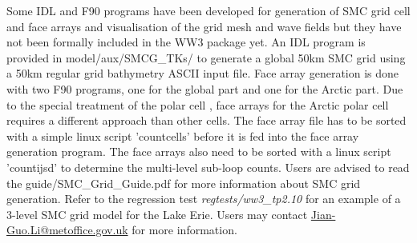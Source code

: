 Some IDL and F90 programs have been developed for generation of SMC
grid cell and face arrays and visualisation of the grid mesh and wave
fields but they have not been formally included in the WW3 package
yet. An IDL program is provided in model/aux/SMCG\_TKs/ to generate
a global 50km SMC grid using a 50km regular grid bathymetry ASCII
input file. Face array generation is done with two F90 programs, one
for the global part and one for the Arctic part. Due to the special
treatment of the polar cell \citep{art:Li12}, face arrays for the Arctic
polar cell requires a different approach than other cells. The face
array file has to be sorted with a simple linux script 'countcells'
before it is fed into the face array generation program. The face
arrays also need to be sorted with a linux script 'countijsd' to determine
the multi-level sub-loop counts. Users are advised to read the guide/SMC\_Grid\_Guide.pdf
for more information about SMC grid generation. Refer to the regression
test \emph{regtests/ww3\_tp2.10} for an example of a 3-level SMC grid
model for the Lake Erie. Users may contact \url{Jian-Guo.Li@metoffice.gov.uk}
for more information.
